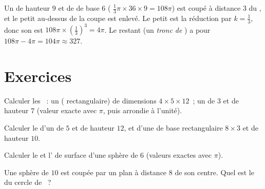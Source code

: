 \begin{example}\label{ex:g9:solids:truncated}
Un  de hauteur $9$ et de  de base $6$ (
$\frac13 \pi \times 36 \times 9 = 108\pi$) est coupé à distance $3$ du
, et le petit  au-dessus de la coupe est enlevé. Le petit 
est la réduction par $k = \frac13$, donc son  est
$108\pi \times \left(\frac13\right)^3 = 4\pi$. Le  restant (un
\emph{tronc de }) a pour  $108\pi - 4\pi = 104\pi \approx 327$.
\end{example}

\section{Exercices}

\begin{exercise}[$\star$]\label{exo:g9:solids:1}
Calculer les ~: un  ( rectangulaire) de dimensions
$4 \times 5 \times 12$~; un  de  $3$ et de hauteur $7$
(valeur exacte avec $\pi$, puis arrondie à l'unité).
\end{exercise}

\begin{exercise}[$\star$]\label{exo:g9:solids:2}
Calculer le  d'un  de  $5$ et de hauteur $12$, et d'une
 de base rectangulaire $8 \times 3$ et de hauteur $10$.
\end{exercise}

\begin{exercise}[$\star$]\label{exo:g9:solids:3}
Calculer le  et l' de surface d'une sphère de  $6$
(valeurs exactes avec $\pi$).
\end{exercise}

\begin{exercise}[$\star$]\label{exo:g9:solids:4}
Une sphère de  $10$ est coupée par un plan à distance $8$ de son
centre. Quel est le  du cercle de ~?
\end{exercise}

